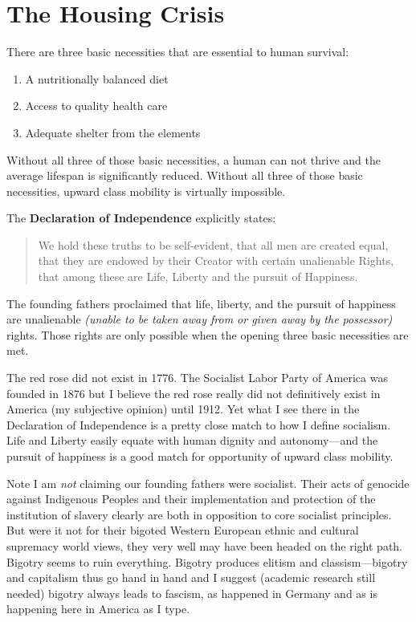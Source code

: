 \section{The Housing Crisis}

There are three basic necessities that are essential to human survival:

\begin{enumerate}
\item A nutritionally balanced diet
\item Access to quality health care
\item Adequate shelter from the elements
\end{enumerate}

Without all three of those basic necessities, a human can not thrive and the average lifespan is significantly reduced. Without all three of those basic necessities, upward class mobility is virtually impossible.

The \textbf{Declaration of Independence} explicitly states:

\begin{quote}
{\ampscriptfont%
We hold these truths to be self-evident, that all men are created equal, that they are endowed by their Creator with certain unalienable Rights, that among these are Life, Liberty and the pursuit of Happiness.}
\end{quote}

The founding fathers proclaimed that life, liberty, and the pursuit of happiness are unalienable \emph{(unable to be taken away from or given away by the possessor)} rights. Those rights are only possible when the opening three basic necessities are met.

The red rose did not exist in 1776. The Socialist Labor Party of America was founded in 1876 but I believe the red rose really did not definitively exist in America (my subjective opinion) until 1912. Yet what I see there in the Declaration of Independence is a pretty close match to how I define socialism. Life and Liberty easily equate with human dignity and autonomy---and the pursuit of happiness is a good match for opportunity of upward class mobility.

Note I am \emph{not} claiming our founding fathers were socialist. Their acts of genocide against Indigenous Peoples and their implementation and protection of the institution of slavery clearly are both in opposition to core socialist principles. But were it not for their bigoted Western European ethnic and cultural supremacy world views, they very well may have been headed on the right path. Bigotry seems to ruin everything. Bigotry produces elitism and classism---bigotry and capitalism thus go hand in hand and I suggest (academic research still needed) bigotry always leads to fascism, as happened in Germany and as is happening here in America as I type.

